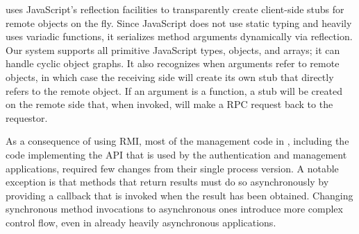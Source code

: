 \nodermi uses JavaScript's reflection facilities to transparently create client-side 
stubs for remote objects on the fly.
Since JavaScript does not use static typing and heavily uses variadic functions,
it serializes method arguments dynamically via reflection.  Our system supports all
primitive JavaScript types, objects, and arrays; it can handle cyclic 
object graphs.  It also recognizes when arguments refer to remote objects, in which case 
the receiving side will create its own stub that directly refers to the remote object.
If an argument is a function, a stub will be created on the remote side that, when 
invoked, will make a RPC request back to the requestor.

As a consequence of using RMI, most of the management code in \cbtwo, including the
code implementing the \cb API that is used by the authentication and management applications,
required few changes from their single process version.  A notable exception is that 
methods that return results must do so asynchronously by providing a callback that
is invoked when the result has been obtained.  Changing synchronous method invocations
to asynchronous ones introduce more complex control flow, even in already heavily
asynchronous applications.

